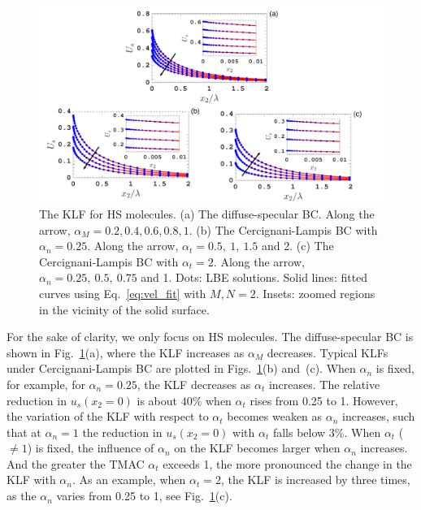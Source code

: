 \begin{figure}[t]
	\centering
	\includegraphics[width=1\textwidth]{SlipJump/IMG/vel_def_CL_Max}
	\caption{The KLF for HS molecules. (a) The diffuse-specular BC. Along the arrow,   $\alpha_M=0.2,0.4,0.6,0.8,1$. (b) The Cercignani-Lampis BC with $\alpha_n=0.25$. Along the arrow, $\alpha_t=0.5,~1,~1.5$ and 2. (c) The Cercignani-Lampis BC with $\alpha_t=2$. Along the arrow, $\alpha_n=0.25,~0.5,~0.75$ and 1. Dots: LBE solutions. Solid lines: fitted curves using Eq.~\eqref{eq:vel_fit} with $M,N=2$. Insets: zoomed regions in the vicinity of the solid surface. %
	}
	\label{fig:vel_def_cl_max}
\end{figure}

For the sake of clarity, we only focus on  HS molecules. The diffuse-specular BC is shown in Fig.~\ref{fig:vel_def_cl_max}(a), where the KLF increases as $\alpha_M$ decreases. Typical KLFs under Cercignani-Lampis BC are plotted in Figs.~\ref{fig:vel_def_cl_max}(b) and~(c). When $\alpha_n$ is fixed, for example, for $\alpha_n=0.25$, the KLF decreases as $\alpha_t$ increases. The relative reduction in $u_s(x_2=0)$ is about $40\%$ when $\alpha_t$ rises from 0.25 to 1. However, the variation of the KLF with respect to $\alpha_t$ becomes weaken as $\alpha_n$ increases, such that at $\alpha_n=1$ the reduction in $u_s(x_2=0)$ with $\alpha_t$ falls below $3\%$. When $\alpha_t$ ($\neq1$) is fixed, the influence of $\alpha_n$ on the KLF becomes larger when $\alpha_n$ increases. And the greater the TMAC $\alpha_t$ exceeds 1, the more pronounced the change in the KLF with $\alpha_n$. As an example, when $\alpha_t=2$, the KLF is increased by three times, as the $\alpha_n$ varies from 0.25 to 1, see Fig.~\ref{fig:vel_def_cl_max}(c).  


